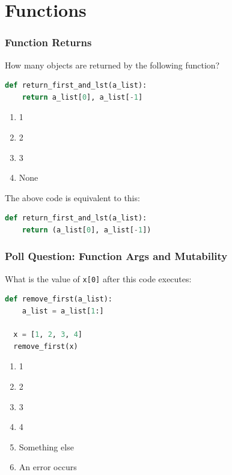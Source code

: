 \documentclass{beamer}
\begin{document}
\section{Functions}

%
%
\begin{frame}[fragile]
  \frametitle{Function Returns}
  How many objects are returned by the following function?
  \begin{lstlisting}[language=Python, autogobble]
  def return_first_and_lst(a_list):
    return a_list[0], a_list[-1]
  \end{lstlisting}
  \vfill
  \begin{enumerate}[A]
    \item 1
    \item 2
    \item 3
    \item None
  \end{enumerate}
  \vfill
  \pause
  The above code is equivalent to this:
  \begin{lstlisting}[language=Python, autogobble]
  def return_first_and_lst(a_list):
    return (a_list[0], a_list[-1])
  \end{lstlisting}
\end{frame}

%
%
\begin{frame}[fragile]
  \frametitle{Poll Question: Function Args and Mutability}
  What is the value of \lstinline|x[0]| after this code executes:
  \begin{lstlisting}[language=Python, autogobble]
  def remove_first(a_list):
    a_list = a_list[1:]

  x = [1, 2, 3, 4]
  remove_first(x)
  \end{lstlisting}
  \vfill
  \begin{enumerate}[A]
    \item 1
    \item 2
    \item 3
    \item 4
    \item Something else
    \item An error occurs
  \end{enumerate}
\end{frame}
\end{document}
